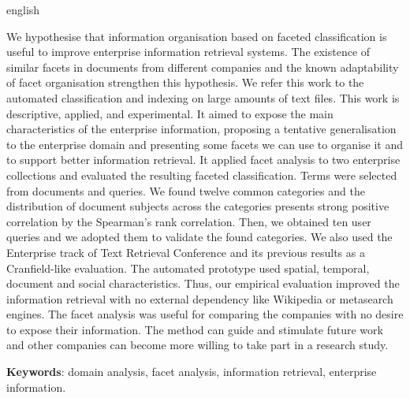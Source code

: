 \begin{resumo}[Abstract]

    \begin{otherlanguage*}{english}

        \noindent 
            We hypothesise that information organisation based on faceted classification is useful to improve enterprise information retrieval systems. The existence of similar facets in documents from different companies and the known adaptability of facet organisation strengthen this hypothesis. We refer this work to the automated classification and indexing on large amounts of text files. This work is descriptive, applied, and experimental. It aimed to expose the main characteristics of the enterprise information, proposing a tentative generalisation to the enterprise domain and presenting some facets we can use to organise it and to support better information retrieval. It applied facet analysis to two enterprise collections and evaluated the resulting faceted classification. Terms were selected from documents and queries. We found twelve common categories and the distribution of document subjects across the categories presents strong positive correlation by the Spearman’s rank correlation. Then, we obtained ten user queries and we adopted them to validate the found categories. We also used the Enterprise track of Text Retrieval Conference and its previous results as a Cranfield-like evaluation. The automated prototype used spatial, temporal, document and social characteristics. Thus, our empirical evaluation improved the information retrieval with no external dependency like Wikipedia or metasearch engines. The facet analysis was useful for comparing the companies with no desire to expose their information. The method can guide and stimulate future work and other companies can become more willing to take part in a research study.
        \noindent  
        
        \textbf{Keywords}: domain analysis, facet analysis, information retrieval, enterprise information.
 
    \end{otherlanguage*}

\end{resumo}